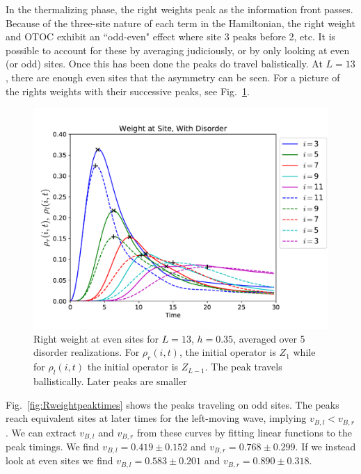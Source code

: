 \documentclass[aps,prx,reprint,superscriptaddress, longbibliography]{revtex4-1}
\newcommand{\charlie}[1]{{\color{Magenta}{{#1}}}}
\begin{document}
In the thermalizing phase, the right weights peak as the information front passes. Because of the three-site nature of each term in the Hamiltonian, the right weight and OTOC exhibit an ``odd-even" effect where site 3 peaks before 2, etc. It is possible to account for these by averaging judiciously, or by only looking at even (or odd) sites. Once this has been done the peaks do travel balistically. At $L=13$, there are enough even sites that the asymmetry can be seen. For a picture of the rights weights with their successive peaks, see Fig.~\ref{fig:Rweightpeakshape}. 

\begin{figure}
	\includegraphics[width=\columnwidth]{Rweightpeakshape}
	\caption{Right weight at even sites for $L=13$, $h=0.35$, averaged over 5 disorder realizations. For $\rho_r(i,t)$, the initial operator is $Z_1$ while for $\rho_l(i,t)$ the initial operator is $Z_{L-1}$. The peak travels ballistically. Later peaks are smaller \charlie{Is this due to broadening?}}
	\label{fig:Rweightpeakshape}
\end{figure}

Fig.~\ref{fig:Rweightpeaktimes} shows the peaks traveling on odd sites. The peaks reach equivalent sites at later times for the left-moving wave, implying $v_{B,l}<v_{B,r}$. We can extract $v_{B,l}$ and $v_{B,r}$ from these curves by fitting linear functions to the peak timings. We find $v_{B,l}=0.419\pm 0.152$ and $v_{B,r}=0.768\pm0.299$. If we instead look at even sites we find $v_{B,l}=0.583\pm 0.201$ and $v_{B,r}=0.890\pm0.318$.
\end{document}
